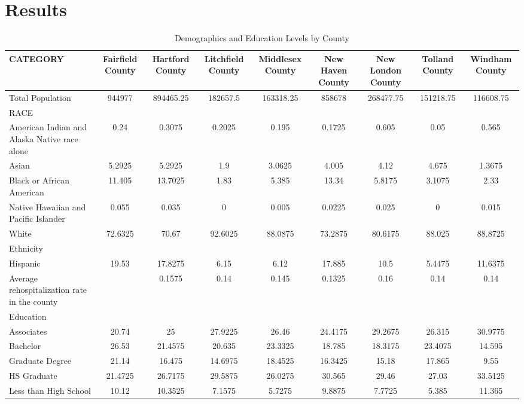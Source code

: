 \documentclass[12pt]{article}
\begin{document}
\section{Results}\label{sec:resu}


 

\begin{table}[h]
    \centering
    \caption{Demographics and Education Levels by County} \label{tab:connecticut-counties}
    \begin{tabular}{l|cccccccc}
    \hline
    \textbf{CATEGORY} & \textbf{Fairfield County} & \textbf{Hartford County} & \textbf{Litchfield County} & \textbf{Middlesex County} & \textbf{New Haven County} & \textbf{New London County} & \textbf{Tolland County} & \textbf{Windham County} \\ \hline
    Total Population & 944977 & 894465.25 & 182657.5 & 163318.25 & 858678 & 268477.75 & 151218.75 & 116608.75 \\
    RACE &  &  &  &  &  &  &  &  \\
    American Indian and Alaska Native race alone & 0.24 & 0.3075 & 0.2025 & 0.195 & 0.1725 & 0.605 & 0.05 & 0.565 \\
    Asian & 5.2925 & 5.2925 & 1.9 & 3.0625 & 4.005 & 4.12 & 4.675 & 1.3675 \\
    Black or African American & 11.405 & 13.7025 & 1.83 & 5.385 & 13.34 & 5.8175 & 3.1075 & 2.33 \\
    Native Hawaiian and Pacific Islander & 0.055 & 0.035 & 0 & 0.005 & 0.0225 & 0.025 & 0 & 0.015 \\
    White & 72.6325 & 70.67 & 92.6025 & 88.0875 & 73.2875 & 80.6175 & 88.025 & 88.8725 \\
    Ethnicity &  &  &  &  &  &  &  &  \\
    Hispanic & 19.53 & 17.8275 & 6.15 & 6.12 & 17.885 & 10.5 & 5.4475 & 11.6375 \\
    Average rehospitalization rate in the county &  & 0.1575 & 0.14 & 0.145 & 0.1325 & 0.16 & 0.14 & 0.14 \\
    Education &  &  &  &  &  &  &  &  \\
    Associates & 20.74 & 25 & 27.9225 & 26.46 & 24.4175 & 29.2675 & 26.315 & 30.9775 \\
    Bachelor & 26.53 & 21.4575 & 20.635 & 23.3325 & 18.785 & 18.3175 & 23.4075 & 14.595 \\
    Graduate Degree & 21.14 & 16.475 & 14.6975 & 18.4525 & 16.3425 & 15.18 & 17.865 & 9.55 \\
    HS Graduate & 21.4725 & 26.7175 & 29.5875 & 26.0275 & 30.565 & 29.46 & 27.03 & 33.5125 \\
    Less than High School & 10.12 & 10.3525 & 7.1575 & 5.7275 & 9.8875 & 7.7725 & 5.385 & 11.365 \\ \hline
    \end{tabular}
    \end{table}    
\end{document}
